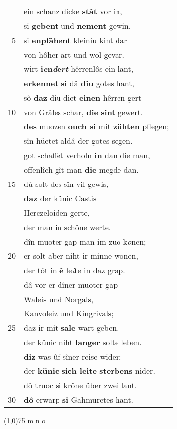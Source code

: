 \documentclass[8pt,a4paper,notitlepage]{article}
\begin{document}
\begin{table}[ht]
\begin{minipage}[t]{0.5\linewidth}
\begin{tabular}{rl}
 & ein schanz dicke \textbf{stât} vor in,\\ 
 & si \textbf{gebent} und \textbf{nement} gewin.\\ 
5 & si \textbf{enpfâhent} kleiniu kint dar\\ 
 & von hôher art und wol gevar.\\ 
 & wirt \textbf{i\textit{e}n\textit{d}e\textit{rt}} hêrrenlôs ein lant,\\ 
 & \textbf{erkennet} \textbf{si} dâ \textbf{diu} gotes hant,\\ 
 & sô \textbf{daz} diu diet \textbf{einen} hêrren gert\\ 
10 & von Grâles schar, \textbf{die} \textbf{sint} gewert.\\ 
 & \textbf{des} muozen \textbf{ouch si} mit \textbf{zühten} pflegen;\\ 
 & sîn hüetet aldâ der gotes segen.\\ 
 & got schaffet verholn \textbf{in} dan die man,\\ 
 & offenlîch gît man \textbf{die} megde dan.\\ 
15 & dû solt des sîn vil gewis,\\ 
 & \textbf{daz} der künic Castis\\ 
 & Herczeloiden gerte,\\ 
 & der man in schône werte.\\ 
 & dîn muoter gap man im zuo k\textit{o}nen;\\ 
20 & er solt aber niht ir minne wonen,\\ 
 & der tôt in \textbf{ê} le\textit{i}te in daz grap.\\ 
 & dâ vor er dîner muoter gap\\ 
 & Waleis und Norgals,\\ 
 & Kanvoleiz und Kingrivals;\\ 
25 & daz ir mit \textbf{sale} wart geben.\\ 
 & der künic niht \textbf{langer} solte leben.\\ 
 & \textbf{diz} was ûf sîner reise wider:\\ 
 & der \textbf{künic} \textbf{sich leite} \textbf{sterbens} nider.\\ 
 & dô truoc si krône über zwei lant.\\ 
30 & \textbf{dô} erwarp \textbf{si} Gahmuretes hant.\\ 
\end{tabular}
\scriptsize
\line(1,0){75} \newline
m n o \newline

\end{minipage}
\end{table}
\end{document}
